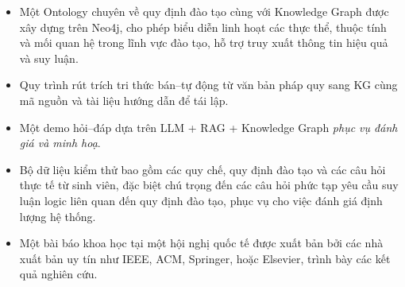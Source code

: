 \documentclass[a4paper,12pt]{article}
\begin{document}
\begin{itemize}
    \item Một Ontology chuyên về quy định đào tạo cùng với Knowledge Graph được xây dựng trên Neo4j, cho phép biểu diễn linh hoạt các thực thể, thuộc tính và mối quan hệ trong lĩnh vực đào tạo, hỗ trợ truy xuất thông tin hiệu quả và suy luận.

    \item Quy trình rút trích tri thức bán–tự động từ văn bản pháp quy sang KG cùng mã nguồn và tài liệu hướng dẫn để tái lập.

    \item Một demo hỏi–đáp dựa trên LLM + RAG + Knowledge Graph \textit{phục vụ đánh giá và minh hoạ}.

    \item Bộ dữ liệu kiểm thử bao gồm các quy chế, quy định đào tạo và các câu hỏi thực tế từ sinh viên, đặc biệt chú trọng đến các câu hỏi phức tạp yêu cầu suy luận logic liên quan đến quy định đào tạo, phục vụ cho việc đánh giá định lượng hệ thống.

    \item Một bài báo khoa học tại một hội nghị quốc tế được xuất bản bởi các nhà xuất bản uy tín như IEEE, ACM, Springer, hoặc Elsevier, trình bày các kết quả nghiên cứu.
\end{itemize}
\end{document}
